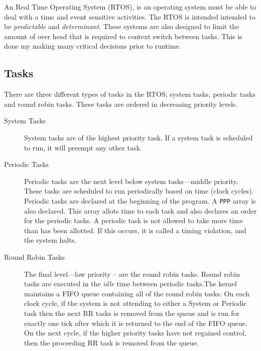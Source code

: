                                        

An Real Time Operating System (RTOS), is an operating system must be able to
deal with a time and event sensitive activities. The RTOS is intended intended
to be \textit{predictable} and \textit{determinant}\cite{RTOSMantis}. These
systems are also designed to limit the amount of over head that is required to
context switch between tasks. This is done my making many critical decisions
prior to runtime.



\subsection{Tasks}

There are three different types of tasks in the RTOS; system tasks, periodic tasks and round robin tasks. These tasks are ordered in decreasing priority levels.

\begin{description}
    \item[System Tasks]
    System tasks are of the highest priority task. If a system task is
    scheduled to run, it will preempt any other task.

    \item[Periodic Tasks]
    Periodic tasks are the next level below system tasks---middle priority.
    These tasks are scheduled to run periodically based on time (clock cycles).
    Periodic tasks are declared at the beginning of the program. A \texttt{PPP}
    array is also declared. This array allots time to each task and also
    declares an order for the periodic tasks. A periodic task is not allowed to
    take more time than has been allotted.  If this occurs, it is called a
    timing violation, and the system halts.

    \item[Round Robin Tasks]
    The final level---low priority -- are the round robin tasks. Round robin tasks
    are executed in the \textit{idle} time between periodic tasks.The kernel
    maintains a FIFO queue containing all of the round robin tasks. On each clock
    cycle, if the system is not attending to either a System or Periodic task then
    the next RR tasks is removed from the queue and is run for exactly one tick
    after which it is returned to the end of the FIFO queue. On the next cycle, if
    the higher priority tasks have not regained control, then the proceeding RR
    task is removed from the queue.  
\end{description}



